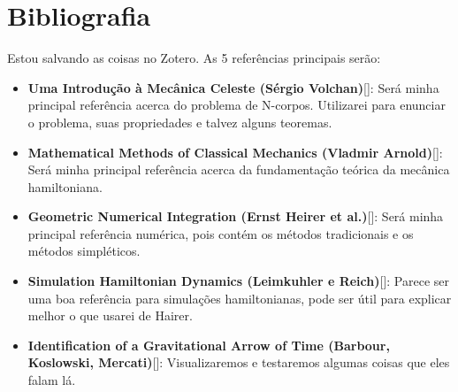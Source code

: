 \section{Bibliografia}

Estou salvando as coisas no Zotero. As 5 referências principais serão:

\begin{itemize}
  \item \textbf{Uma Introdução à Mecânica Celeste (Sérgio Volchan)}[\cite{volchan_uma_2021}]: Será minha principal referência acerca do problema de N-corpos. Utilizarei para enunciar o problema, suas propriedades e talvez alguns teoremas.
  \item \textbf{Mathematical Methods of Classical Mechanics (Vladmir Arnold)}[\cite{arnold_mathematical_1989}]: Será minha principal referência acerca da fundamentação teórica da mecânica hamiltoniana.
  \item \textbf{Geometric Numerical Integration (Ernst Heirer et al.)}[\cite{ernst_heirer_geometric_2006}]: Será minha principal referência numérica, pois contém os métodos tradicionais e os métodos simpléticos.
  \item \textbf{Simulation Hamiltonian Dynamics (Leimkuhler e Reich)}[\cite{leimkuhler_simulating_2005}]: Parece ser uma boa referência para simulações hamiltonianas, pode ser útil para explicar melhor o que usarei de Hairer.
  \item \textbf{Identification of a Gravitational Arrow of Time (Barbour, Koslowski, Mercati)}[\cite{barbour_identification_2014}]: Visualizaremos e testaremos algumas coisas que eles falam lá.
\end{itemize}